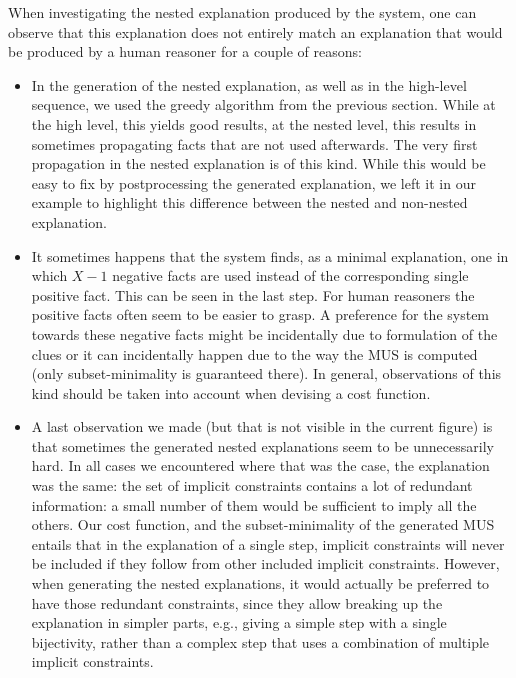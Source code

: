 When investigating the nested explanation produced by the system, one can observe that this explanation does not entirely match an explanation that would be produced by a human reasoner for a couple of reasons: 
\begin{itemize}
 \item In the generation of the nested explanation, as well as in the high-level sequence, we used the greedy algorithm from the previous section. 
 While at the high level, this yields good results, at the nested level, this results in sometimes propagating facts that are not used afterwards. 
 The very first propagation in the nested explanation is of this kind.
 While this would be easy to fix by postprocessing the generated explanation, we left it in our example to highlight this difference between the nested and non-nested explanation. 
 \item It sometimes happens that the system finds, as a minimal explanation, one in which $X-1$ negative facts are used instead of the corresponding single positive fact. This can be seen in the last step. For human reasoners the positive facts often seem to be easier to grasp. A preference for the system towards these negative facts might be incidentally due to formulation of the clues or it can incidentally happen due to the way the MUS is computed (only subset-minimality is guaranteed there). 
 In general, observations of this kind should be taken into account when devising a cost function. 
 \item A last observation we made (but that is not visible in the current figure) is that sometimes the generated nested explanations seem to be unnecessarily hard. In all cases we encountered where that was the case, the explanation was the same: the set of implicit constraints contains a lot of redundant information: a small number of them would be sufficient to imply all the others. Our cost function, and the subset-minimality of the generated MUS entails that in the explanation of a single step, implicit constraints will never be included if they follow from other included implicit constraints. However, when generating the nested explanations, it would actually be preferred to have those redundant constraints, since they allow breaking up the explanation in simpler parts, e.g., giving a simple step with a single bijectivity, rather than a complex step that uses a combination of multiple implicit constraints.
\end{itemize}



